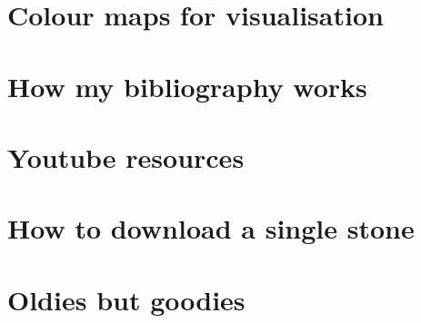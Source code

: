 \section{Colour maps for visualisation}  %
\section{How my bibliography works}  %
\section{Youtube resources}  %
\section{How to download a single stone}  %
\section{Oldies but goodies}  %
